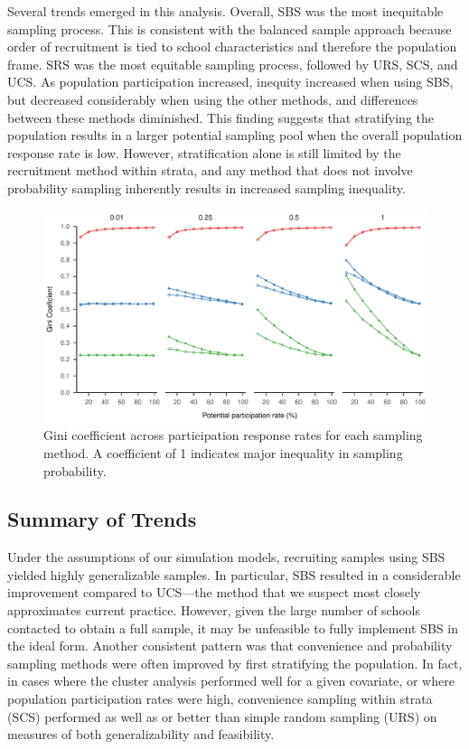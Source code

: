 \documentclass[
  man,floatsintext]{apa6}
\begin{document}
Several trends emerged in this analysis. Overall, SBS was the most inequitable sampling process. This is consistent with the balanced sample approach because order of recruitment is tied to school characteristics and therefore the population frame. SRS was the most equitable sampling process, followed by URS, SCS, and UCS.
As population participation increased, inequity increased when using SBS, but decreased considerably when using the other methods, and differences between these methods diminished. This finding suggests that stratifying the population results in a larger potential sampling pool when the overall population response rate is low.
However, stratification alone is still limited by the recruitment method within strata, and any method that does not involve probability sampling inherently results in increased sampling inequality.



\begin{figure}
\centering
\includegraphics{6---Paper_files/figure-latex/fig-gini-1.pdf}
\caption{\label{fig:fig-gini}Gini coefficient across participation response rates for each sampling method. A coefficient of 1 indicates major inequality in sampling probability.}
\end{figure}

\hypertarget{summary-of-trends}{%
\subsection*{Summary of Trends}\label{summary-of-trends}}

Under the assumptions of our simulation models, recruiting samples using SBS yielded highly generalizable samples. In particular, SBS resulted in a considerable improvement compared to UCS---the method that we suspect most closely approximates current practice. However, given the large number of schools contacted to obtain a full sample, it may be unfeasible to fully implement SBS in the ideal form. Another consistent pattern was that convenience and probability sampling methods were often improved by first stratifying the population. In fact, in cases where the cluster analysis performed well for a given covariate, or where population participation rates were high, convenience sampling within strata (SCS) performed as well as or better than simple random sampling (URS) on measures of both generalizability and feasibility.
\end{document}
